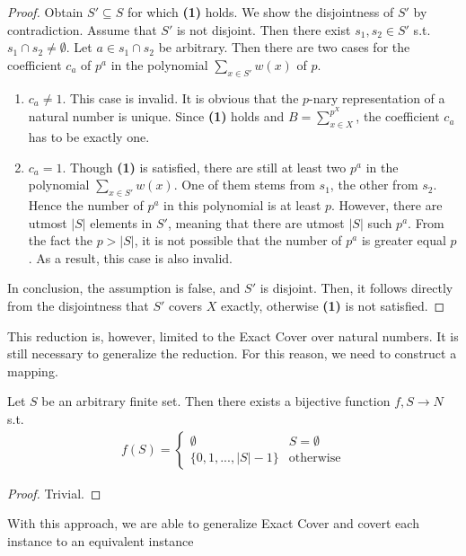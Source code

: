 \begin{proof}
    \label{lemma:sscompl}
    Obtain $S' \subseteq S$ for which \textbf{(1)} holds. We show the disjointness of $S'$ by contradiction. 
Assume that $S'$ is not disjoint. Then there exist $s_1, s_2 \in S'$ s.t. $s_1 \cap s_2 \not= \emptyset$. Let $a \in s_1 \cap s_2$ be arbitrary. Then 
there are two cases for the coefficient $c_a$ of $p^a$ in the polynomial $\sum_{x \in S'} w(x)$ of $p$. 
\begin{enumerate}
    \item $c_a \neq 1$. This case is invalid. It is obvious that the $p$-nary representation of 
    a natural number is unique. Since \textbf{(1)} holds and $B = \sum_{x \in X}^{p^X}$, the coefficient 
    $c_a$ has to be exactly one.
    \item $c_a = 1$. Though \textbf{(1)} is satisfied, there are still at least two $p^a$ in the polynomial $\sum_{x \in S'} w(x)$.
    One of them stems from $s_1$, the other from $s_2$.
    Hence the number of $p^a$ in this polynomial is at least $p$. However, there are utmost $|S|$ elements in $S'$, meaning that there are utmost $|S|$ such $p^a$. From the 
    fact the $p > |S|$, it is not possible that the number of $p^a$ is greater equal $p$. As a result, this case is also invalid.
\end{enumerate}
In conclusion, the assumption is false, and $S'$ is disjoint. Then, it follows directly from the disjointness that $S'$ covers $X$ exactly, otherwise \textbf{(1)}
is not satisfied.
\end{proof}
This reduction is, however, limited to the Exact Cover over natural numbers. It is still necessary to generalize the reduction. 
For this reason, we need to construct a mapping.
\begin{lemma}
    Let $S$ be an arbitrary finite set. Then there exists a bijective function $f, S \rightarrow N$ s.t. 
    \begin{align*}
        f(S) = \begin{cases}
            \emptyset & S = \emptyset \\ 
            \{0, 1, ..., |S| - 1\} & \text{otherwise}
        \end{cases}
    \end{align*}
\end{lemma}
\begin{proof}
    Trivial.
\end{proof}
With this approach, we are able to generalize Exact Cover and covert each instance to an equivalent instance 
